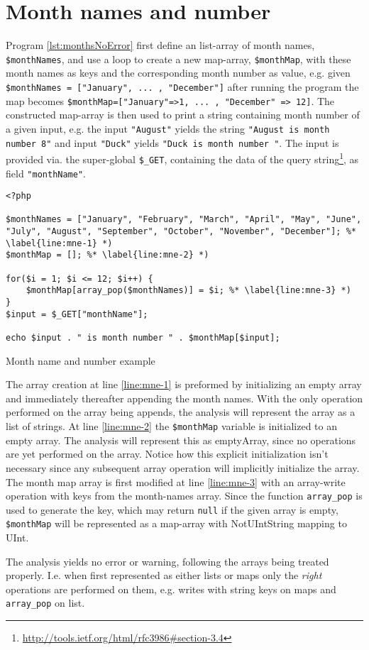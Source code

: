 \section{Month names and number}


Program \ref{lst:monthsNoError} first define an list-array of month names, \texttt{\$monthNames}, and use a loop to create a new map-array, \texttt{\$monthMap}, with these month names as keys and the corresponding month number as value, e.g. given \texttt{\$monthNames = ["January", ... , "December"]} after running the program the map becomes \texttt{\$monthMap=["January"=>1, ... , "December" => 12]}. The constructed map-array is then used to print a string containing month number of a given input, e.g. the input \texttt{"August"} yields the string \texttt{"August is month number 8"} and input \texttt{"Duck"} yields \texttt{"Duck is month number "}. The input is provided via. the super-global \texttt{\$\_GET}, containing the data of the query string\footnote{\url{http://tools.ietf.org/html/rfc3986\#section-3.4}}, as field \texttt{"monthName"}. 


\begin{program}
\begin{lstlisting}
<?php

$monthNames = ["January", "February", "March", "April", "May", "June", "July", "August", "September", "October", "November", "December"]; %* \label{line:mne-1} *)
$monthMap = []; %* \label{line:mne-2} *)

for($i = 1; $i <= 12; $i++) {
	$monthMap[array_pop($monthNames)] = $i; %* \label{line:mne-3} *)
}
$input = $_GET["monthName"];

echo $input . " is month number " . $monthMap[$input];
\end{lstlisting}
\caption{Month name and number example}
\label{lst:monthsNoError}
\end{program}

The array creation at line \ref{line:mne-1} is preformed by initializing an empty array and immediately thereafter appending the month names. With the only operation performed on the array being appends, the analysis will represent the array as a list of strings. At line \ref{line:mne-2} the \texttt{\$monthMap} variable is initialized to an empty array. The analysis will represent this as emptyArray, since no operations are yet performed on the array. Notice how this explicit initialization isn't necessary since any subsequent array operation will implicitly initialize the array. The month map array is first modified at line \ref{line:mne-3} with an array-write operation with keys from the month-names array. Since the function \texttt{array\_pop} is used to generate the key, which may return \texttt{null} if the given array is empty, \texttt{\$monthMap} will be represented as a map-array with NotUIntString mapping to UInt. 

The analysis yields no error or warning, following the arrays being treated properly. I.e. when first represented as either lists or maps only the \emph{right} operations are performed on them, e.g. writes with string keys on maps and \texttt{array\_pop} on list.  
